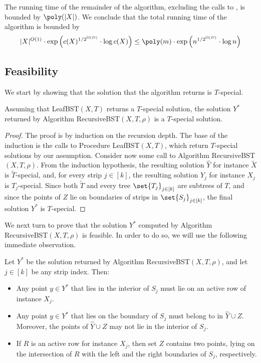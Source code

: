 The running time of the remainder of the algorithm, excluding the calls to \leafBST, is bounded by $\poly(|X|)$. We conclude that the total running time of the algorithm is bounded by 
\[|X|^{O(1)}\cdot \exp\left({c(X)^{1/2^{\Omega(D)}}\cdot \log c(X)}\right )\leq \poly(m)\cdot \exp\left(n^{1/2^{\Omega(D)}}\cdot \log n \right )\] 


\subsection{Feasibility} 

We start by showing that the solution that the algorithm returns is $T$-special.

\begin{myobs}\label{obs: get special sol}
Assuming that {\sc LeafBST}$(X,T)$ returns a $T$-special solution, the solution $Y^*$ returned by Algorithm {\sc RecursiveBST}$(X,T,\rho)$ is  a $T$-special solution. 
\end{myobs}

\begin{proof}
    The proof is by induction on the recursion depth. The base of the induction is the calls to Procedure {\sc LeafBST}$(X,T)$, which return $T$-special solutions by our assumption.
Consider now some call to Algorithm {\sc RecursiveBST}$(X,T,\rho)$. From the induction hypothesis, the resulting solution $\hat{Y}$ for instance $\widetilde{X}$ is $\widetilde{T}$-special, and, for every strip $j \in [k]$, the resulting solution $Y_j$ for instance $X_j$ is $T_j$-special. 
Since both $\widetilde{T}$ and every tree $\set{T_j}_{j \in [k]}$ are subtrees of $T$, and since the points of $Z$ lie on boundaries of strips in $\set{S_j}_{j\in[k]}$, the final solution $Y^*$ is $T$-special. 
\end{proof}


%
%
%
%


We next turn to prove that the solution $Y^*$ computed by Algorithm {\sc RecursiveBST}$(X,T,\rho)$ is feasible. In order to do so, we will use the following immediate observation.



%
\begin{myobs}
	\label{obs:points structure} 
	Let $Y^*$ be the solution returned by Algorithm {\sc RecursiveBST}$(X,T,\rho)$, and let $j \in [k]$ be any strip index. Then:
	\begin{itemize}
		\item Any point $y\in Y^*$ that lies in the interior of $S_j$ must lie on an active row of instance $X_j$.
		\item Any point $y\in Y^*$ that lies on the boundary of $S_j$ must belong to in $\hat{Y}\cup Z$. Moreover, the points of $\hat{Y} \cup Z$ may not lie in the interior of $S_j$. 
\item If $R$ is an active row for instance $X_j$, then set $Z$ contains two points, lying on the intersection of $R$ with the left and the right boundaries of $S_j$, respectively.
		
%
	\end{itemize}
\end{myobs}

